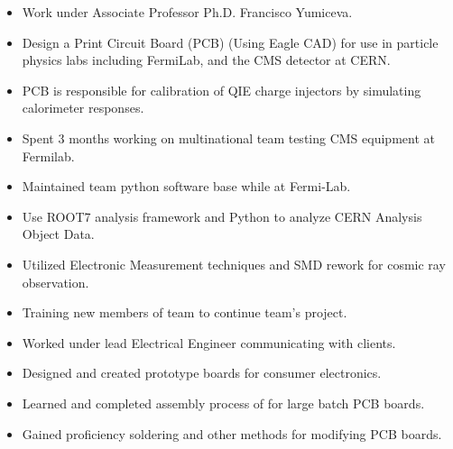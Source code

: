 \documentclass[10pt,a4paper,ragged2e,withhyper]{altacv}
\begin{document}
\begin{paracol}{2}
\medskip
{}
\begin{itemize}
\item Work under Associate Professor Ph.D. Francisco Yumiceva.
\item Design a Print Circuit Board (PCB) (Using Eagle CAD) for use in particle physics labs including FermiLab, and the CMS detector at CERN.
\item PCB is responsible for calibration of QIE charge injectors by simulating calorimeter responses.
\item Spent 3 months working on multinational team testing CMS equipment at Fermilab.
\item Maintained team python software base while at Fermi-Lab.
\item Use ROOT7 analysis framework and Python to analyze CERN Analysis Object Data.
\item Utilized Electronic Measurement techniques and SMD rework for cosmic ray observation.
\item Training new members of team to continue team’s project.
\end{itemize}
\begin{itemize}
\item Worked under lead Electrical Engineer communicating with clients.
\item Designed and created prototype boards for consumer electronics.
\item Learned and completed assembly process of for large batch PCB boards.
\item Gained proficiency soldering and other methods for modifying PCB boards.
\end{itemize}
\medskip
\newpage


\end{paracol}
\end{document}
